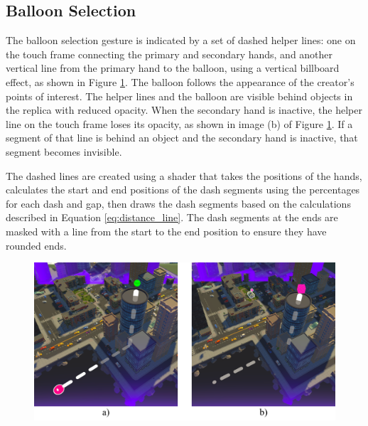     \subsection{Balloon Selection} \label{sec:visual_balloon}
        The balloon selection gesture is indicated by a set of dashed helper lines: one on the touch frame connecting the primary and secondary hands, and another vertical line from the primary hand to the balloon, using a vertical billboard effect, as shown in Figure \ref{fig:balloon_poi}. The balloon follows the appearance of the creator's points of interest. The helper lines and the balloon are visible behind objects in the replica with reduced opacity. When the secondary hand is inactive, the helper line on the touch frame loses its opacity, as shown in image (b) of Figure \ref{fig:balloon_poi}. If a segment of that line is behind an object and the secondary hand is inactive, that segment becomes invisible.

        The dashed lines are created using a shader that takes the positions of the hands, calculates the start and end positions of the dash segments using the percentages for each dash and gap, then draws the dash segments based on the calculations described in Equation \ref{eq:distance_line}. The dash segments at the ends are masked with a line from the start to the end position to ensure they have rounded ends.

        \begin{figure}[h!]
            \centering
            \includegraphics[width=1\textwidth]{figures/balloon_poi.png}
            \label{fig:balloon_poi}
        \end{figure}

